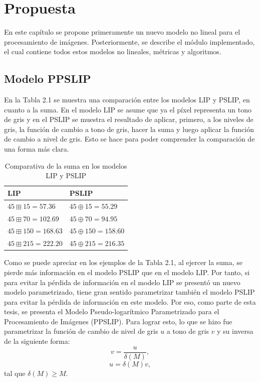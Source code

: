 \chapter{Propuesta}\label{chapter:proposal}

En este cap\'itulo se propone primeramente un nuevo modelo no lineal para el procesamiento de im\'agenes. Posteriormente, se describe el m\'odulo implementado, el cual contiene todos estos modelos no lineales, m\'etricas y algoritmos.

\section{Modelo PPSLIP}

En la Tabla 2.1 se muestra una comparaci\'on entre los modelos LIP y PSLIP, en cuanto a la suma. En el modelo LIP se asume que ya el p\'ixel representa un tono de gris y en el PSLIP se muestra el resultado de aplicar, primero, a los niveles de gris, la funci\'on de cambio a tono de gris, hacer la suma y luego aplicar la funci\'on de cambio a nivel de gris. Esto se hace para poder comprender la comparaci\'on de una forma m\'as clara.

\begin{table}
	\caption{Comparativa de la suma en los modelos LIP y PSLIP}
	\begin{center}
		\begin{tabular}{|l|l|}
			\hline 
			\textbf{LIP} & \textbf{PSLIP}\\
			\hline
			$45 \boxplus 15 = 57.36$ & $45 \oplus 15 = 55.29$\\
			\hline
			$45 \boxplus 70 = 102.69$ & $45 \oplus 70 = 94.95$\\
			\hline
			$45 \boxplus 150 = 168.63$ & $45 \oplus 150 = 158.60$\\
			\hline
			$45 \boxplus 215 = 222.20$ & $45 \oplus 215 = 216.35$\\
			\hline
		\end{tabular}
	\end{center}
\end{table}

Como se puede apreciar en los ejemplos de la Tabla 2.1, al ejercer la suma, se pierde m\'as informaci\'on en el modelo PSLIP que en el modelo LIP. Por tanto, si para evitar la p\'erdida de informaci\'on en el modelo LIP se present\'o un nuevo modelo parametrizado, tiene gran sentido parametrizar tambi\'en el modelo PSLIP para evitar la p\'erdida de informaci\'on en este modelo. Por eso, como parte de esta tesis, se presenta el Modelo Pseudo-logar\'itmico Parametrizado para el Procesamiento de Im\'agenes (PPSLIP). Para lograr esto, lo que se hizo fue parametrizar la funci\'on de cambio de nivel de gris $u$ a tono de gris $v$ y su inversa de la siguiente forma:
\begin{equation}
	v=\frac{u}{\delta(M)},
\end{equation}
\begin{equation}
	u=\delta(M)v,
\end{equation}
tal que $\delta(M) \geq M$.

